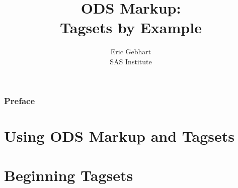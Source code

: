 \documentclass{book}
\begin{document}
\lstset{language=tagsets}

\fancyhead{} %
\fancyhead[LO,RE]{\thepage}
\fancyhead[RO]{}
\fancyhead[LE]{}
\fancyfoot[CO,CE]{}

\frontmatter
\title{ODS Markup: \\
Tagsets by Example}
\author{Eric Gebhart\\
SAS Institute}
\renewcommand{\today}{September 22, 2003}
\maketitle
  \section*{Preface}

\cleardoublepage
\tableofcontents
\cleardoublepage
\cleardoublepage
\listoftables


\mainmatter
\cleardoublepage
{}
\fancyhead{} %
\lhead[\rm\thepage]{\sl\rightmark}
\rhead[\sl\leftmark]{\rm\thepage}


\part{Using ODS Markup and Tagsets}

\cleardoublepage

\cleardoublepage

\cleardoublepage

\cleardoublepage

\cleardoublepage

\cleardoublepage

\part{Beginning Tagsets}
\end{document}
